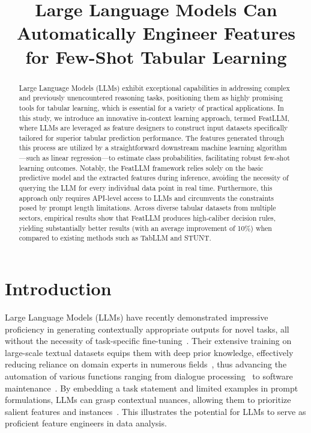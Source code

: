 \title{Large Language Models Can Automatically Engineer Features for Few-Shot Tabular Learning}

\begin{abstract}
Large Language Models (LLMs) exhibit exceptional capabilities in addressing complex and previously unencountered reasoning tasks, positioning them as highly promising tools for tabular learning, which is essential for a variety of practical applications. In this study, we introduce an innovative in-context learning approach, termed \textsf{FeatLLM}, where LLMs are leveraged as feature designers to construct input datasets specifically tailored for superior tabular prediction performance. The features generated through this process are utilized by a straightforward downstream machine learning algorithm—such as linear regression—to estimate class probabilities, facilitating robust few-shot learning outcomes. Notably, the \textsf{FeatLLM} framework relies solely on the basic predictive model and the extracted features during inference, avoiding the necessity of querying the LLM for every individual data point in real time. Furthermore, this approach only requires API-level access to LLMs and circumvents the constraints posed by prompt length limitations. Across diverse tabular datasets from multiple sectors, empirical results show that \textsf{FeatLLM} produces high-caliber decision rules, yielding substantially better results (with an average improvement of 10\%) when compared to existing methods such as TabLLM and STUNT.
\end{abstract}

\section{Introduction}
Large Language Models (LLMs) have recently demonstrated impressive proficiency in generating contextually appropriate outputs for novel tasks, all without the necessity of task-specific fine-tuning~\cite{creswell2022selection,imani2023mathprompter,taylor2022galactica}. Their extensive training on large-scale textual datasets equips them with deep prior knowledge, effectively reducing reliance on domain experts in numerous fields~\cite{Genomes2021,singhal2023large,wilcox2003role}, thus advancing the automation of various functions ranging from dialogue processing~\cite{finch2023leveraging} to software maintenance~\cite{fan2023automated}. By embedding a task statement and limited examples in prompt formulations, LLMs can grasp contextual nuances, allowing them to prioritize salient features and instances~\cite{brown2020language,zhao2023survey}. This illustrates the potential for LLMs to serve as proficient feature engineers in data analysis.

